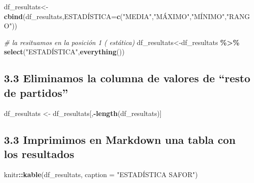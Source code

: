 \documentclass[
]{article}
\newenvironment{Shaded}{\begin{snugshade}}{\end{snugshade}}
\newcommand{\AttributeTok}[1]{\textcolor[rgb]{0.13,0.29,0.53}{#1}}
\newcommand{\CommentTok}[1]{\textcolor[rgb]{0.56,0.35,0.01}{\textit{#1}}}
\newcommand{\FunctionTok}[1]{\textcolor[rgb]{0.13,0.29,0.53}{\textbf{#1}}}
\newcommand{\NormalTok}[1]{#1}
\newcommand{\OtherTok}[1]{\textcolor[rgb]{0.56,0.35,0.01}{#1}}
\newcommand{\SpecialCharTok}[1]{\textcolor[rgb]{0.81,0.36,0.00}{\textbf{#1}}}
\newcommand{\StringTok}[1]{\textcolor[rgb]{0.31,0.60,0.02}{#1}}
\begin{document}
\begin{Shaded}
\begin{Highlighting}[]
\NormalTok{df\_resultats}\OtherTok{\textless{}{-}}\FunctionTok{cbind}\NormalTok{(df\_resultats,ESTADÍSTICA}\OtherTok{=}\FunctionTok{c}\NormalTok{(}\StringTok{"MEDIA"}\NormalTok{,}\StringTok{"MÁXIMO"}\NormalTok{,}\StringTok{"MÍNIMO"}\NormalTok{,}\StringTok{"RANGO"}\NormalTok{))}
\end{Highlighting}
\end{Shaded}

\begin{Shaded}
\begin{Highlighting}[]
\CommentTok{\# la resituamos en la posición 1 ( estática)}
\NormalTok{df\_resultats}\OtherTok{\textless{}{-}}\NormalTok{df\_resultats }\SpecialCharTok{\%\textgreater{}\%} \FunctionTok{select}\NormalTok{(}\StringTok{"ESTADÍSTICA"}\NormalTok{,}\FunctionTok{everything}\NormalTok{())}
\end{Highlighting}
\end{Shaded}

\hypertarget{eliminamos-la-columna-de-valores-de-resto-de-partidos}{%
\subsection{3.3 Eliminamos la columna de valores de ``resto de
partidos''}\label{eliminamos-la-columna-de-valores-de-resto-de-partidos}}

\begin{Shaded}
\begin{Highlighting}[]
\NormalTok{df\_resultats }\OtherTok{\textless{}{-}}\NormalTok{ df\_resultats[,}\SpecialCharTok{{-}}\FunctionTok{length}\NormalTok{(df\_resultats)]}
\end{Highlighting}
\end{Shaded}

\hypertarget{imprimimos-en-markdown-una-tabla-con-los-resultados}{%
\subsection{3.3 Imprimimos en Markdown una tabla con los
resultados}\label{imprimimos-en-markdown-una-tabla-con-los-resultados}}

\begin{Shaded}
\begin{Highlighting}[]
\NormalTok{knitr}\SpecialCharTok{::}\FunctionTok{kable}\NormalTok{(df\_resultats, }\AttributeTok{caption =} \StringTok{"ESTADÍSTICA SAFOR"}\NormalTok{)}
\end{Highlighting}
\end{Shaded}
\end{document}
